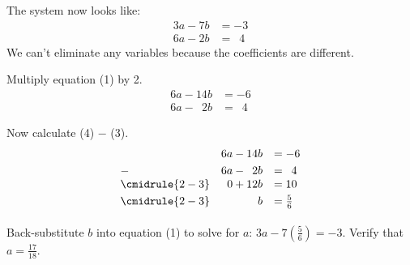 \begin{minipage}[t]{0.3\linewidth}
The system now looks like:
\begin{align*}
3a-7b&=-3\tag{1}\\
6a-2b&=\phantom{1}4\tag{3}
\end{align*}
We can't eliminate any variables because the coefficients are different. 
\end{minipage}
\hspace{\fill}
\begin{minipage}[t]{0.3\linewidth}
Multiply equation (1) by 2.
\begin{align*}
6a-14b&=-6\tag{4}\\
6a-\phantom{1}2b&=\phantom{1}4\tag{3}
\end{align*}
\end{minipage}
\hspace{\fill}
\begin{minipage}[t]{0.3\linewidth}
Now calculate (4) $-$ (3).	
\[\begin{array}{lrl}
			&	       6a-14b&=-6			\\[\jot]
-\phantom{1}&6a-\phantom{1}2b&=\phantom{1}4 \\
\cmidrule{2-3}
& 0+12b&=10  \\[\jot]
\cmidrule{2-3}
& b&=\frac{5}{6}  \\[\jot]
\end{array}\]	
\end{minipage}

Back-substitute $b$ into equation (1) to solve for $a$: $3a-7(\frac{5}{6})=-3$. Verify that $a=\frac{17}{18}$.	
	

